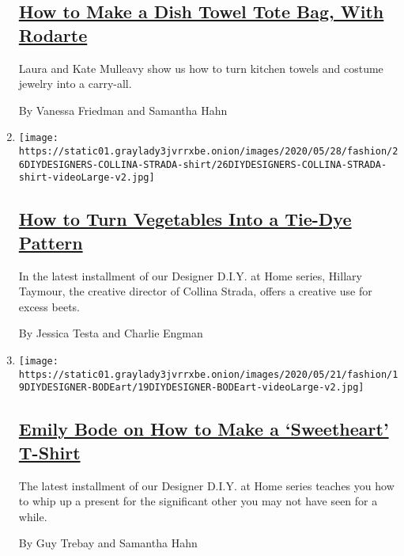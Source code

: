 \begin{enumerate}
  \hypertarget{how-to-make-a-dish-towel-tote-bag-with-rodarte}{%
  \subsection{\texorpdfstring{\href{/2020/06/02/style/dish-towel-tote-bag.html}{How
  to Make a Dish Towel Tote Bag, With
  Rodarte}}{How to Make a Dish Towel Tote Bag, With Rodarte}}\label{how-to-make-a-dish-towel-tote-bag-with-rodarte}}

  Laura and Kate Mulleavy show us how to turn kitchen towels and costume
  jewelry into a carry-all.

  By Vanessa Friedman and Samantha Hahn
\item
  \texttt{[image: https://static01.graylady3jvrrxbe.onion/images/2020/05/28/fashion/26DIYDESIGNERS-COLLINA-STRADA-shirt/26DIYDESIGNERS-COLLINA-STRADA-shirt-videoLarge-v2.jpg]}

  \hypertarget{how-to-turn-vegetables-into-a-tie-dye-pattern}{%
  \subsection{\texorpdfstring{\href{/2020/05/27/style/tie-dye-plaid-with-collina-strada.html}{How
  to Turn Vegetables Into a Tie-Dye
  Pattern}}{How to Turn Vegetables Into a Tie-Dye Pattern}}\label{how-to-turn-vegetables-into-a-tie-dye-pattern}}

  In the latest installment of our Designer D.I.Y. at Home series,
  Hillary Taymour, the creative director of Collina Strada, offers a
  creative use for excess beets.

  By Jessica Testa and Charlie Engman
\item
  \texttt{[image: https://static01.graylady3jvrrxbe.onion/images/2020/05/21/fashion/19DIYDESIGNER-BODEart/19DIYDESIGNER-BODEart-videoLarge-v2.jpg]}

  \hypertarget{emily-bode-on-how-to-make-a-sweetheart-t-shirt}{%
  \subsection{\texorpdfstring{\href{/2020/05/19/style/emily-bode-sweetheart-t-shirt.html}{Emily
  Bode on How to Make a `Sweetheart'
  T-Shirt}}{Emily Bode on How to Make a `Sweetheart' T-Shirt}}\label{emily-bode-on-how-to-make-a-sweetheart-t-shirt}}

  The latest installment of our Designer D.I.Y. at Home series teaches
  you how to whip up a present for the significant other you may not
  have seen for a while.

  By Guy Trebay and Samantha Hahn
\end{enumerate}


